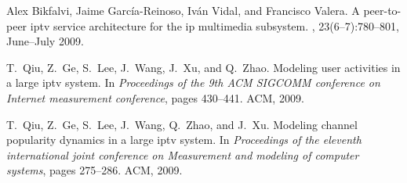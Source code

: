 \documentclass[portrait,a0paper]{baposter}
\begin{document}
\begin{poster}
{{\begin{thebibliography}{1}

Alex Bikfalvi, Jaime Garc\'{i}a-Reinoso, Iv\'{a}n Vidal, and Francisco Valera.
\newblock A peer-to-peer iptv service architecture for the ip multimedia
  subsystem.
,
  23(6--7):780--801, June--July 2009.

T.~Qiu, Z.~Ge, S.~Lee, J.~Wang, J.~Xu, and Q.~Zhao.
\newblock Modeling user activities in a large iptv system.
\newblock In {\em Proceedings of the 9th ACM SIGCOMM conference on Internet
  measurement conference}, pages 430--441. ACM, 2009.

T.~Qiu, Z.~Ge, S.~Lee, J.~Wang, Q.~Zhao, and J.~Xu.
\newblock Modeling channel popularity dynamics in a large iptv system.
\newblock In {\em Proceedings of the eleventh international joint conference on
  Measurement and modeling of computer systems}, pages 275--286. ACM, 2009.

\end{thebibliography}
}

}

\end{poster}
\end{document}
